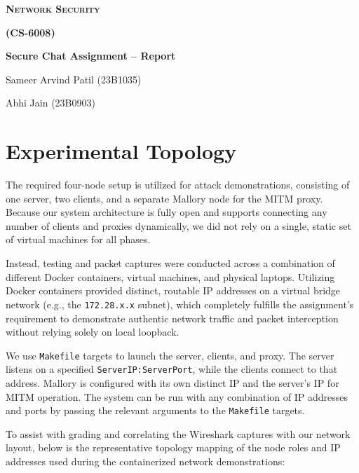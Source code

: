 \documentclass[11pt]{article}
\begin{document}
\begin{titlepage}
    \centering
    {\scshape\bfseries\Huge Network Security\par}
    \vspace{0.2cm}
    {\scshape\bfseries\Huge (CS-6008)\par}
    \vspace{0.8cm}
    {\huge \textbf{Secure Chat Assignment -- Report}\par}
    \vspace{1cm}
    {\Large Sameer Arvind Patil (23B1035)\par}
    {\Large Abhi Jain (23B0903)\par}
    \vfill
\end{titlepage}

\tableofcontents
\clearpage

\section{Experimental Topology}

The required four-node setup is utilized for attack demonstrations, consisting of one server, two clients, and a separate Mallory node for the MITM proxy. Because our system architecture is fully open and supports connecting any number of clients and proxies dynamically, we did not rely on a single, static set of virtual machines for all phases. 

Instead, testing and packet captures were conducted across a combination of different Docker containers, virtual machines, and physical laptops. Utilizing Docker containers provided distinct, routable IP addresses on a virtual bridge network (e.g., the \texttt{172.28.x.x} subnet), which completely fulfills the assignment's requirement to demonstrate authentic network traffic and packet interception without relying solely on local loopback. 

We use \texttt{Makefile} targets to launch the server, clients, and proxy. The server listens on a specified \texttt{ServerIP:ServerPort}, while the clients connect to that address. Mallory is configured with its own distinct IP and the server's IP for MITM operation. The system can be run with any combination of IP addresses and ports by passing the relevant arguments to the \texttt{Makefile} targets.

To assist with grading and correlating the Wireshark captures with our network layout, below is the representative topology mapping of the node roles and IP addresses used during the containerized network demonstrations:
\end{document}
